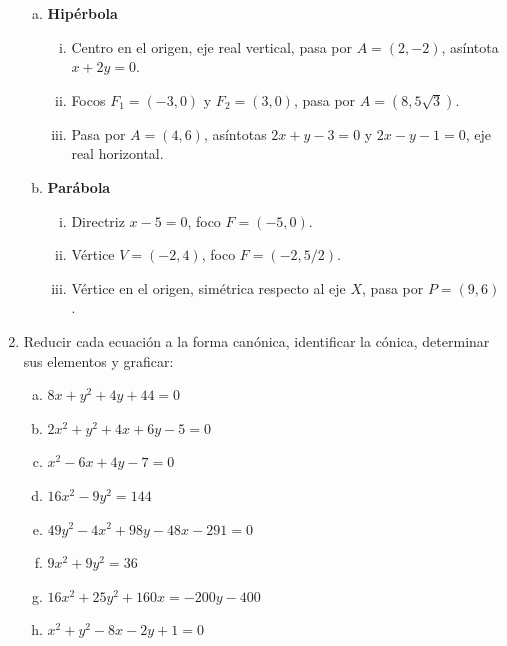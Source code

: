 \documentclass[11pt]{article}
\begin{document}
\begin{enumerate}[\hspace{-5mm}$1)$]
\begin{enumerate}[a)]
\item \textbf{Hipérbola}
\begin{enumerate}[i.]
\item Centro en el origen, eje real vertical, pasa por $A = (2, -2)$, asíntota $x + 2y = 0$.
\item Focos $F_1 = (-3, 0)$ y $F_2 = (3, 0)$, pasa por $A = (8, 5\sqrt{3})$.
\item Pasa por $A = (4, 6)$, asíntotas $2x + y - 3 = 0$ y $2x - y - 1 = 0$, eje real horizontal.
\end{enumerate}

\item \textbf{Parábola}
\begin{enumerate}[i.]
\item Directriz $x - 5 = 0$, foco $F = (-5, 0)$.
\item Vértice $V = (-2, 4)$, foco $F = (-2, 5/2)$.
\item Vértice en el origen, simétrica respecto al eje $X$, pasa por $P = (9, 6)$.
\end{enumerate}
\end{enumerate}








\item Reducir cada ecuación a la forma canónica, identificar la cónica, determinar sus elementos y graficar:
\begin{multicols}{2}
\begin{enumerate}[a)]
\item $8x + y^2 + 4y + 44 = 0$
\item $2x^2 + y^2 + 4x + 6y - 5 = 0$
\item $x^2 - 6x + 4y - 7 = 0$
\item $16x^2 - 9y^2 = 144$
\item $49y^2 - 4x^2 + 98y - 48x - 291 = 0$
\item $9x^2 + 9y^2 = 36$
\item $16x^2 + 25y^2 + 160x = -200y - 400$
\item $x^2 + y^2 - 8x - 2y + 1 = 0$
\end{enumerate}
\end{multicols}








\end{enumerate}
\end{document}
